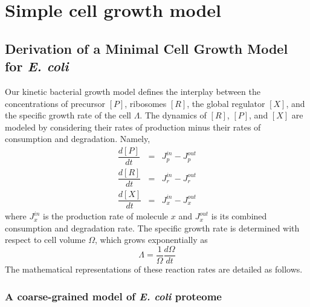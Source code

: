 \documentclass[11pt]{article}
\begin{document}
\section{Simple cell growth model}

\subsection{Derivation of a Minimal Cell Growth Model for \textit{E. coli}}

{\color{black}Our kinetic bacterial growth model} defines {\color{black}the interplay between the concentrations of precursor $[P]$, ribosomes $[R]$, the global regulator $[X]$,} and the specific growth rate of the cell $\Lambda$. The dynamics of {\color{black}$[R]$, $[P]$, and $[X]$ are} modeled by {\color{black}considering} the{\color{black}ir} rate{\color{black}s} of production minus the{\color{black}ir} rate{\color{black}s} of consumption and degradation. {\color{black}Namely,}
\begin{eqnarray}
\dfrac{d [P]}{d t} &=&  J_p^{in}-J_p^{out} \label{eq:amino_acid_general_equation}\\
\dfrac{d [R]}{d t} &=&  J_r^{in}-J_r^{out}  \label{eq:ribosome_general_equation} \\
\dfrac{d [X]}{d t} &=&  J_x^{in}-J_x^{out} \label{eq:ppGpp_general_equation}
\end{eqnarray}
{\color{black}where $J_x^{in}$ is the production rate of molecule $x$ and $J_x^{out}$ is its combined consumption and degradation rate.} The specific growth rate is determined {\color{black}with respect to} cell volume $\Omega$, which grows exponentially {\color{black}as}
\begin{equation}\label{eq:growth_rate_general_equation}
\Lambda = \dfrac{1}{\Omega}\dfrac{d \Omega}{d t}
\end{equation}
The mathematical representations of these reaction rates are detailed as follows.

\subsubsection{A coarse-grained model of \textit{E. coli} proteome}
\end{document}
